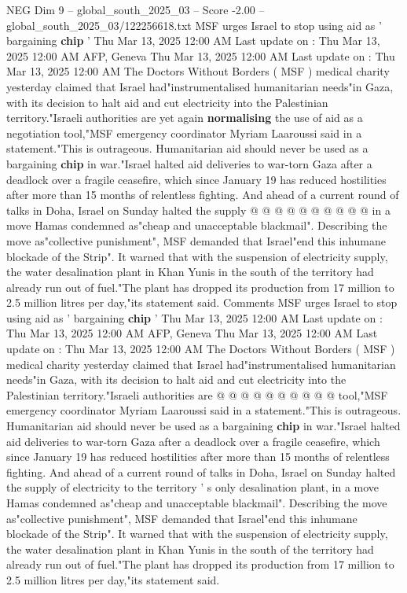 \begin{textsample}{NEG Dim 9 – global\_south\_2025\_03 – Score -2.00 – global\_south\_2025\_03/122256618.txt}  \label{ex:f9_neg_321}
MSF urges Israel to stop using aid as ' bargaining \textbf{chip} ' Thu Mar 13, 2025 12:00 AM Last update on : Thu Mar 13, 2025 12:00 AM AFP, Geneva Thu Mar 13, 2025 12:00 AM Last update on : Thu Mar 13, 2025 12:00 AM The Doctors Without Borders ( MSF ) medical charity yesterday claimed that Israel had"instrumentalised humanitarian needs"in Gaza, with its decision to halt aid and cut electricity into the Palestinian territory."Israeli authorities are yet again \textbf{normalising} the use of aid as a negotiation tool,"MSF emergency coordinator Myriam Laaroussi said in a statement."This is outrageous.
Humanitarian aid should never be used as a bargaining \textbf{chip} in war."Israel halted aid deliveries to war-torn Gaza after a deadlock over a fragile ceasefire, which since January 19 has reduced hostilities after more than 15 months of relentless fighting.
And ahead of a current round of talks in Doha, Israel on Sunday halted the supply @ @ @ @ @ @ @ @ @ @ in a move Hamas condemned as"cheap and unacceptable blackmail".
Describing the move as"collective punishment", MSF demanded that Israel"end this inhumane blockade of the Strip".
It warned that with the suspension of electricity supply, the water desalination plant in Khan Yunis in the south of the territory had already run out of fuel."The plant has dropped its production from 17 million to 2.5 million litres per day,"its statement said.
Comments MSF urges Israel to stop using aid as ' bargaining \textbf{chip} ' Thu Mar 13, 2025 12:00 AM Last update on : Thu Mar 13, 2025 12:00 AM AFP, Geneva Thu Mar 13, 2025 12:00 AM Last update on : Thu Mar 13, 2025 12:00 AM The Doctors Without Borders ( MSF ) medical charity yesterday claimed that Israel had"instrumentalised humanitarian needs"in Gaza, with its decision to halt aid and cut electricity into the Palestinian territory."Israeli authorities are @ @ @ @ @ @ @ @ @ @ tool,"MSF emergency coordinator Myriam Laaroussi said in a statement."This is outrageous.
Humanitarian aid should never be used as a bargaining \textbf{chip} in war."Israel halted aid deliveries to war-torn Gaza after a deadlock over a fragile ceasefire, which since January 19 has reduced hostilities after more than 15 months of relentless fighting.
And ahead of a current round of talks in Doha, Israel on Sunday halted the supply of electricity to the territory ' s only desalination plant, in a move Hamas condemned as"cheap and unacceptable blackmail".
Describing the move as"collective punishment", MSF demanded that Israel"end this inhumane blockade of the Strip".
It warned that with the suspension of electricity supply, the water desalination plant in Khan Yunis in the south of the territory had already run out of fuel."The plant has dropped its production from 17 million to 2.5 million litres per day,"its statement said.

\end{textsample}
